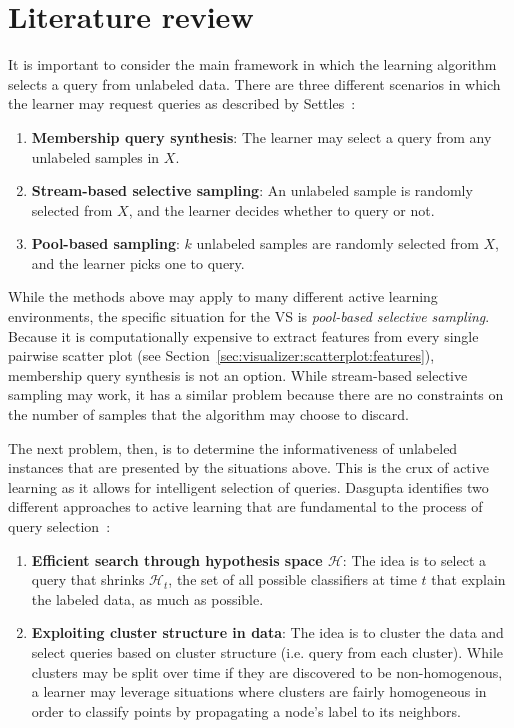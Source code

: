 \section{Literature review}
\label{sec:al:litreview}

It is important to consider the main framework in which the learning algorithm 
selects a query from unlabeled data. There are three different 
scenarios in which the learner may request queries as described by 
Settles~\cite{settles2010}:
 
\tablespacing
\begin{enumerate}
	\item \textbf{Membership query synthesis}: The learner may select a query 
	from any unlabeled samples in $X$.
	\item \textbf{Stream-based selective sampling}: An unlabeled sample is 
	randomly selected from $X$, and the learner decides whether to query or not.
	\item \textbf{Pool-based sampling}: $k$ unlabeled samples are randomly 
	selected from $X$, and the learner picks one to query.
\end{enumerate}
\bodyspacing

\noindent While the methods above may apply to many different active learning 
environments, the specific situation for the VS is \textit{pool-based selective 
sampling}. Because it is computationally expensive to extract features from 
every single pairwise scatter plot (see 
Section~\ref{sec:visualizer:scatterplot:features}), membership query synthesis 
is not an option. While stream-based selective sampling may work, it has a 
similar problem because there are no constraints
on the number of samples that the algorithm may choose to discard. 

The next problem, then, is to determine the informativeness of unlabeled 
instances that are presented by the situations above. This is the crux of 
active learning as it allows for intelligent selection of queries.
Dasgupta identifies two different approaches to active learning that are 
fundamental to the process of query selection~\cite{dasgupta2011}: 

\tablespacing
\begin{enumerate}
	\item \textbf{Efficient search through hypothesis space $\mathcal{H}$}: 
	The idea is to select a query that shrinks $\mathcal{H}_t$, the set of all 
	possible classifiers at time $t$ that explain the labeled data, as much as 
	possible. 
	\item \textbf{Exploiting cluster structure in data}: 
	The idea is to cluster the data and select queries based on cluster 
	structure (i.e. query from each cluster). While clusters may be split over 
	time if they are discovered to be non-homogenous, a learner may leverage 
	situations where clusters are fairly homogeneous in order to classify 
	points by propagating a node's label to its neighbors. 
\end{enumerate}
\bodyspacing

